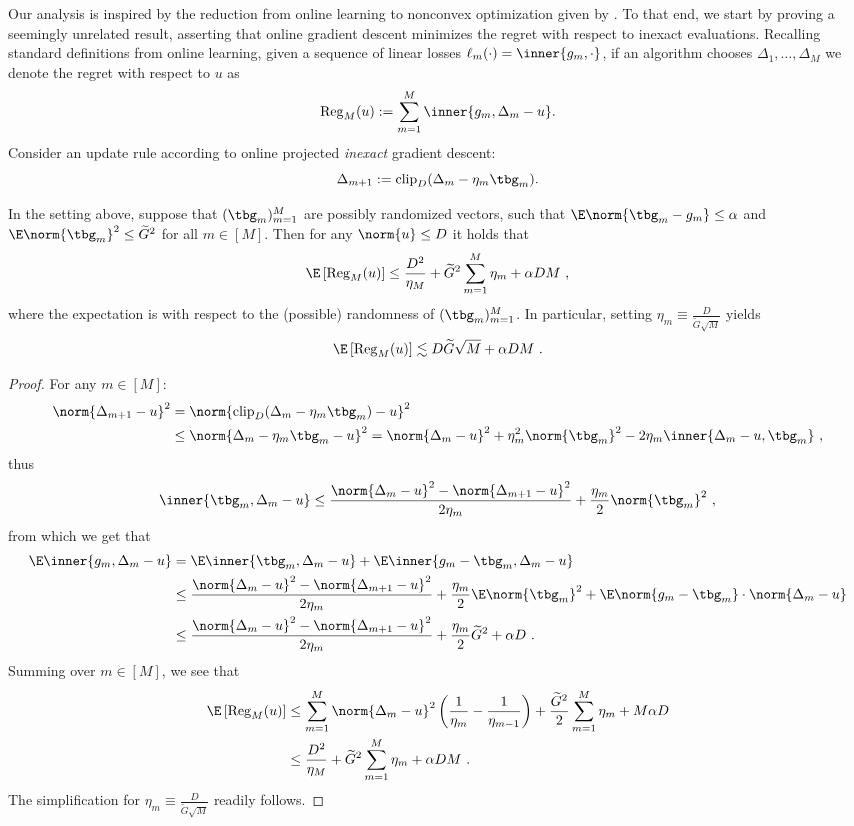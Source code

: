 Our analysis is inspired by the reduction from online learning to nonconvex optimization given by \cite{cutkosky2023optimal}.
To that end, we start by proving a seemingly unrelated result, asserting that online gradient descent minimizes the regret with respect to inexact evaluations. Recalling standard definitions from online learning, given a sequence of linear losses $\ell_m(\cdot)=\inner{g_m,\cdot}$, if an algorithm chooses ${\Delta}_1,\dots,{\Delta}_M$ we denote the regret with respect to $u$ as
\[
\mathrm{Reg}_M(u):=\sum_{m=1}^{M}\inner{g_m,{\Delta}_m-u}.
\]
Consider an update rule according to online projected \emph{inexact} gradient descent:
\[
\Delta_{m+1}:=\mathrm{clip}_{D}(\Delta_{m}-\eta_m\tbg_m).
\]

\begin{lemma} \label{lem: inexact OGD}
In the setting above, suppose that $(\tbg_m)_{m=1}^{M}$ are possibly randomized vectors, such that
$\E\norm{\tbg_m-g_m}\leq\alpha$ and $\E\norm{\tbg_m}^2\leq\widetilde{G}^2$ for all $m\in[M]$.
Then for any $\norm{u}\leq D$ it holds that
\[
\E\left[\mathrm{Reg}_M(u)\right]\leq \frac{D^2}{\eta_M}+\widetilde{G}^2\sum_{m=1}^{M}\eta_m+ \alpha DM~,
\]
where the expectation is with respect to the (possible) randomness of $(\tbg_m)_{m=1}^{M}$.
In particular, setting $\eta_m\equiv\frac{D}{\widetilde{G}\sqrt{M}}$ yields
\[
\E\left[\mathrm{Reg}_M(u)\right]\lesssim D\widetilde{G}\sqrt{M}+\alpha DM~.
\]
\end{lemma}

\begin{proof}
For any $m\in[M]:$
\begin{align*}
\norm{\Delta_{m+1}-u}^2
&=\norm{\mathrm{clip}_{D}(\Delta_{m}-\eta_m\tbg_m)-u}^2
\\&\leq \norm{\Delta_{m}-\eta_m\tbg_m-u}^2
=\norm{\Delta_{m}-u}^2+\eta_m^2\norm{\tbg_m}^2-2\eta_m\inner{\Delta_{m}-u,\tbg_m}~,
\end{align*}
thus
\[
\inner{\tbg_m,\Delta_m-u}
\leq \frac{\norm{\Delta_m-u}^2-\norm{\Delta_{m+1}-u}^2}{2\eta_m}+\frac{\eta_m}{2}\norm{\tbg_m}^2~,
\]
from which we get that
\begin{align*}
\E\inner{g_m,\Delta_m-u}
&=\E\inner{\tbg_m,\Delta_m-u}+
\E\inner{g_m-\tbg_m,\Delta_m-u}
\\
&\leq\frac{\norm{\Delta_m-u}^2-\norm{\Delta_{m+1}-u}^2}{2\eta_m}+\frac{\eta_m}{2}\E\norm{\tbg_m}^2+\E\norm{g_m-\tbg_m}\cdot \norm{\Delta_m-u}
\\&\leq\frac{\norm{\Delta_m-u}^2-\norm{\Delta_{m+1}-u}^2}{2\eta_m}+\frac{\eta_m}{2}\widetilde{G}^2+\alpha D~.
\end{align*}
Summing over $m\in[M]$, we see that
\begin{align*}
\E\left[\mathrm{Reg}_M(u)\right]
&\leq \sum_{m=1}^{M}\norm{\Delta_m-u}^2\left(\frac{1}{\eta_m}-\frac{1}{\eta_{m-1}}\right)+\frac{\widetilde{G}^2}{2}\sum_{m=1}^{M}\eta_m+M\alpha D
\\
&\leq \frac{D^2}{\eta_M}+\widetilde{G}^2\sum_{m=1}^{M}\eta_m+ \alpha DM~.
\end{align*}
The simplification for $\eta_m\equiv\frac{D}{\widetilde{G}\sqrt{M}}$ readily follows.
\end{proof}


